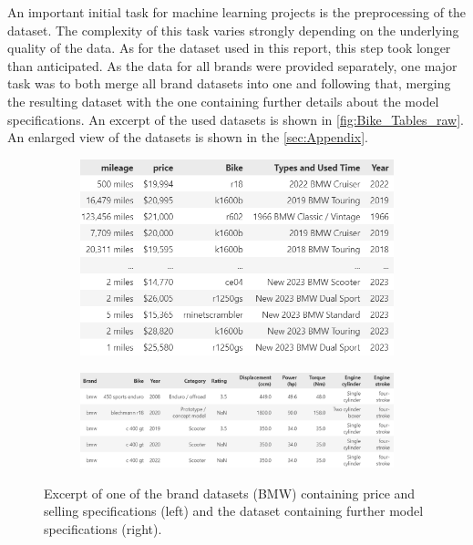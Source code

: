 An important initial task for machine learning projects is the preprocessing of the dataset. The complexity of this task varies strongly depending 
on the underlying quality of the data. As for the dataset used in this report, this step took longer than anticipated. As the data for all brands
were provided separately, one major task was to both merge all brand datasets into one and following that, merging the resulting dataset with the one containing further
details about the model specifications. An excerpt of the used datasets is shown in \autoref{fig:Bike_Tables_raw}. An enlarged view of the
datasets is shown in the \autoref{sec:Appendix}.
\begin{figure}
    \centering
    \begin{subfigure}[h]{0.325\textwidth}
        \centering
        \includegraphics[width=\textwidth]{"content/pics/df_bmw_raw.png"}
    \end{subfigure}
    \hfill
    \begin{subfigure}[h]{0.66\textwidth}
        \centering
        \includegraphics[width=\textwidth]{"content/pics/df_bikez_raw.png"}
    \end{subfigure}
    \caption{Excerpt of one of the brand datasets (BMW) containing price and selling specifications (left) and the dataset
    containing further model specifications (right).}
    \label{fig:Bike_Tables_raw}
\end{figure}
